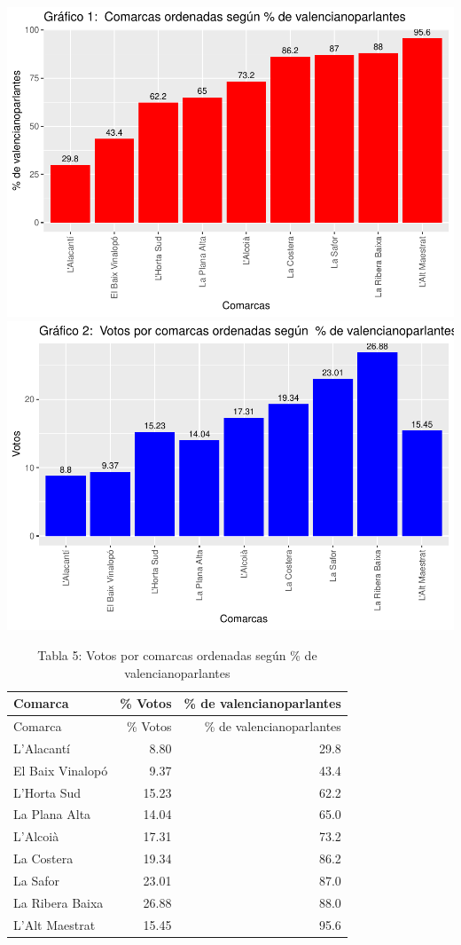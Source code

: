 \documentclass[
]{article}
\begin{document}
\includegraphics{votovalencianista-ea2023_files/figure-latex/ordenValencianoparlantes-1.pdf}
\includegraphics{votovalencianista-ea2023_files/figure-latex/ordenValencianoparlantes-2.pdf}

\begin{longtable}[]{@{}lrr@{}}
\caption{Tabla 5: Votos por comarcas ordenadas según \% de
valencianoparlantes}\tabularnewline
\toprule\noalign{}
Comarca & \% Votos & \% de valencianoparlantes \\
\midrule\noalign{}
\endfirsthead
\toprule\noalign{}
Comarca & \% Votos & \% de valencianoparlantes \\
\midrule\noalign{}
\endhead
\bottomrule\noalign{}
\endlastfoot
L'Alacantí & 8.80 & 29.8 \\
El Baix Vinalopó & 9.37 & 43.4 \\
L'Horta Sud & 15.23 & 62.2 \\
La Plana Alta & 14.04 & 65.0 \\
L'Alcoià & 17.31 & 73.2 \\
La Costera & 19.34 & 86.2 \\
La Safor & 23.01 & 87.0 \\
La Ribera Baixa & 26.88 & 88.0 \\
L'Alt Maestrat & 15.45 & 95.6 \\
\end{longtable}
\end{document}
